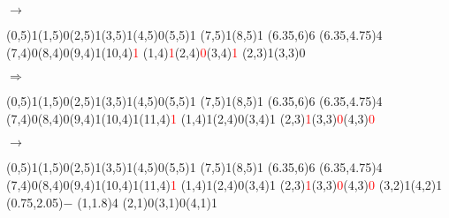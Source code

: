 \documentclass[11pt,a4paper]{article}
\begin{document}
\begin{center}
\begin{table}[ht!]
\begin{minipage}{0.15\textwidth}
  \end{minipage}
  \hfillx
  \begin{minipage}{0.1\textwidth}
    \centering

$ \rightarrow $

  \end{minipage}
\end{table}

\begin{table}[ht!]
  \centering
  \begin{minipage}{0.15\textwidth}

\par\vspace{6\oplineheight}
\oplput(0,5){1}\oplput(1,5){0}\oplput(2,5){1}\oplput(3,5){1}\oplput(4,5){0}\oplput(5,5){1}
\oplput(7,5){1}\oplput(8,5){1}
\opvline(6.35,6){6}
\ophline(6.35,4.75){4}
\oplput(7,4){0}\oplput(8,4){0}\oplput(9,4){1}\oplput(10,4){\textcolor{red}{1}}
\oplput(1,4){\textcolor{red}{1}}\oplput(2,4){\textcolor{red}{0}}\oplput(3,4){\textcolor{red}{1}}
\oplput(2,3){1}\oplput(3,3){0}

  \end{minipage}
  \hfillx
  \begin{minipage}{0.1\textwidth}
    \centering

$ \Rightarrow $

  \end{minipage}
  \hfillx
  \begin{minipage}{0.15\textwidth}

\par\vspace{6\oplineheight}
\oplput(0,5){1}\oplput(1,5){0}\oplput(2,5){1}\oplput(3,5){1}\oplput(4,5){0}\oplput(5,5){1}
\oplput(7,5){1}\oplput(8,5){1}
\opvline(6.35,6){6}
\ophline(6.35,4.75){4}
\oplput(7,4){0}\oplput(8,4){0}\oplput(9,4){1}\oplput(10,4){1}\oplput(11,4){\textcolor{red}{1}}
\oplput(1,4){1}\oplput(2,4){0}\oplput(3,4){1}
\oplput(2,3){\textcolor{red}{1}}\oplput(3,3){\textcolor{red}{0}}\oplput(4,3){\textcolor{red}{0}}

  \end{minipage}
  \hfillx
  \begin{minipage}{0.1\textwidth}
    \centering

$ \rightarrow $

  \end{minipage}
  \hfillx
  \begin{minipage}{0.15\textwidth}

\par\vspace{6\oplineheight}
\oplput(0,5){1}\oplput(1,5){0}\oplput(2,5){1}\oplput(3,5){1}\oplput(4,5){0}\oplput(5,5){1}
\oplput(7,5){1}\oplput(8,5){1}
\opvline(6.35,6){6}
\ophline(6.35,4.75){4}
\oplput(7,4){0}\oplput(8,4){0}\oplput(9,4){1}\oplput(10,4){1}\oplput(11,4){\textcolor{red}{1}}
\oplput(1,4){1}\oplput(2,4){0}\oplput(3,4){1}
\oplput(2,3){\textcolor{red}{1}}\oplput(3,3){\textcolor{red}{0}}\oplput(4,3){\textcolor{red}{0}}
\oplput(3,2){1}\oplput(4,2){1}
\oplput(0.75,2.05){$-$}
\ophline(1,1.8){4}
\oplput(2,1){0}\oplput(3,1){0}\oplput(4,1){1}


\end{minipage}
\end{table}
\end{center}
\end{document}
